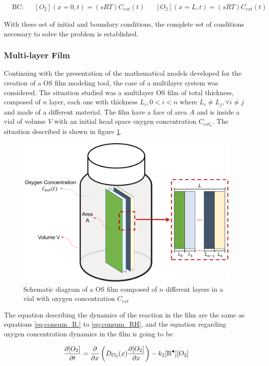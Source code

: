 \begin{refsection}
\begin{align}
    &\text{BC:} & &[O_2](x=0, t)= \left(sRT\right) C_{ext}(t) & & [O_2](x=L, t)= \left(sRT\right) C_{ext}(t)
    \label{eq:bc_mono_film}
\end{align}

With these set of initial and boundary conditions, the complete set of conditions necessary to solve the problem is established.

\subsubsection{Multi-layer Film}
Continuing with the presentation of the mathematical models developed for the creation of a OS film modeling tool, the case of a multilayer system was considered. The situation studied was a multilayer OS film of total thickness,  composed of  $n$ layer, each one with thickness $L_i, 0<i<n$ where  $L_i\neq L_j, \forall  i\neq j$ and made of a different material. The film have a face of area $A$ and is inside a vial of volume $V$ with an initial head space oxygen concentration $C_{ext_o}$. The situation described is shown in figure \ref{fig:model_multilayer_diagram}.

\begin{figure}[ht]
    \centering
    \includegraphics[width=0.62\linewidth]{Documento_Latex/Imagenes/modelo_multicapa.png}
    \caption{Schematic diagram of a OS film composed of $n$ different layers in a vial with oxygen concentration $C_{ext}$}
    \label{fig:model_multilayer_diagram}
\end{figure}

The equation describing the dynamics of the reaction in the film are the same as equations \ref{eq:consum_R.} to \ref{eq:consum_RH}, and the equation regarding oxygen concentration dynamics in the film is going to be

\begin{equation}
    \frac{\partial [O_2]}{\partial t}= \frac{\partial}{\partial x} \left(D_{O_2}(x) \frac{\partial [O_2] }{\partial x}\right) -k_2[\ce{R^.}][O_2]
    \label{eq:mass_bal_def_multi}
\end{equation}


\end{refsection}
